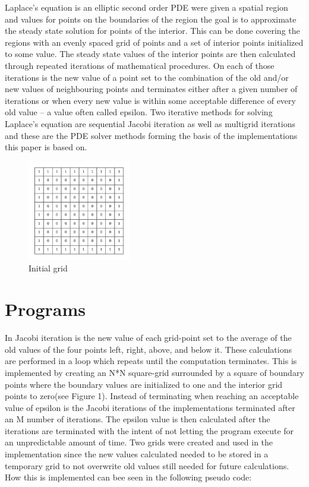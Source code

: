 \documentclass{article}
\begin{document}
Laplace’s equation is an elliptic second order PDE were given a spatial region and values for points on the boundaries of the region the goal is to approximate the steady state solution for points of the interior. This can be done covering the regions with an evenly spaced grid of points and a set of interior points initialized to some value. The steady state values of the interior points are then calculated through repeated iterations of mathematical procedures. On each of those iterations is the new value of a point set to the combination of the old and/or new values of neighbouring points and terminates either after a given number of iterations or when every new value is within some acceptable difference of every old value – a value often called epsilon. Two iterative methods for solving Laplace’s equation are sequential Jacobi iteration as well as multigrid iterations and these are the PDE solver methods forming the basis of the implementations this paper is based on. 

\begin{figure}
    \includegraphics[width=0.4\textwidth]{../images/grid.png}
    \caption{Initial grid}
    \label{grid}
\end{figure}
\newpage

\section{Programs}\label{programs}

In Jacobi iteration is the new value of each grid-point set to the average of the old values of the four points left, right, above, and below it. These calculations are performed in a loop which repeats until the computation terminates. This is implemented by creating an N*N square-grid surrounded by a square of boundary points where the boundary values are initialized to one and the interior grid points to zero(see Figure 1). Instead of terminating when reaching an acceptable value of epsilon is the Jacobi iterations of the implementations terminated after an M number of iterations. The epsilon value is then calculated after the iterations are terminated with the intent of not letting the program execute for an unpredictable amount of time. Two grids were created and used in the implementation since the new values calculated needed to be stored in a temporary grid to not overwrite old values still needed for future calculations. How this is implemented can bee seen in the following pseudo code:
\end{document}
